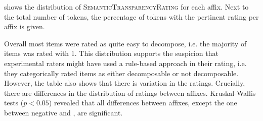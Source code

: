  shows the distribution of \textsc{SemanticTransparencyRating} for each affix. Next to the total number of tokens, the percentage of tokens with the pertinent rating per affix is given. 


\begin{table}

	\caption{Semantic Transparency Rating  by affix }
	\label{tbl:Exp distribution semantic transparency rating}
	
	
\end{table}

Overall most  items were rated as quite easy to decompose, i.e. the majority of items was rated with 1. This distribution supports the suspicion that experimental raters might have used a rule-based approach in their rating, i.e. they categorically rated items as either decomposable or not decomposable. 
However, the table also shows that there is variation in the ratings. 
Crucially, there are differences in the distribution of ratings between affixes. Kruskal-Wallis tests ($p<0.05$) revealed that all differences between affixes, except the one between negative  and , are significant.

